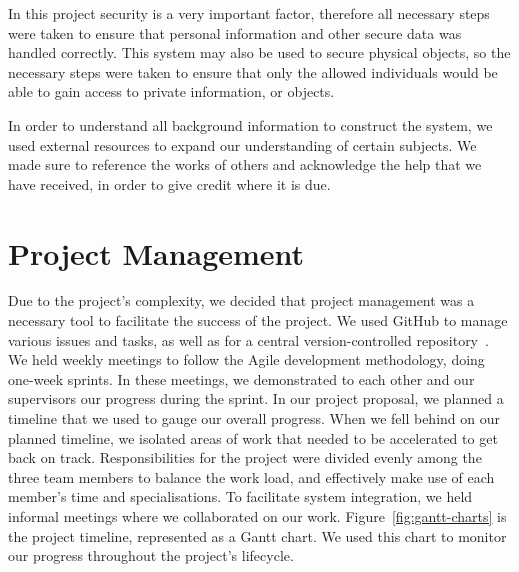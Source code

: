 \documentclass[12pt]{report}
\let\Oldsection\section
\renewcommand{\section}{\FloatBarrier\Oldsection}
\begin{document}
In this project security is a very important factor, therefore all necessary steps were taken to ensure that personal
information and other secure data was handled correctly. This system may also be used to secure physical objects,
so the necessary steps were taken to ensure that only the allowed individuals would be able to gain access to private 
information, or objects.

In order to understand all background information to construct the system, we used external resources to expand our
understanding of certain subjects. We made sure to reference the works of others and acknowledge the help that
we have received, in order to give credit where it is due.


\section{Project Management} \label{project-management}


Due to the project's complexity, we decided that project management was a necessary tool to facilitate 
the success of the project. We used GitHub to manage various issues and tasks, as well as for a central 
version-controlled repository~\autocite{GITHUB}. We held weekly meetings to follow the Agile development methodology, doing one-week 
sprints. In these meetings, we demonstrated to each other and our supervisors our progress during the sprint. In our 
project proposal, we planned a timeline that we used to gauge our overall progress. When we fell behind on our planned 
timeline, we isolated areas of work that needed to be accelerated to get back on track. Responsibilities for the 
project were divided evenly among the three team members to balance the work load, and effectively make use of each 
member's time and specialisations. To facilitate system integration, we held informal meetings where we collaborated on 
our work. Figure~\ref{fig:gantt-charts} is the project timeline, represented as a Gantt chart. We used this chart to 
monitor our progress throughout the project's lifecycle.
\end{document}

